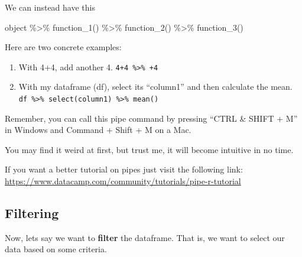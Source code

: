 \documentclass[
]{book}
\newenvironment{Shaded}{\begin{snugshade}}{\end{snugshade}}
\newcommand{\FunctionTok}[1]{\textcolor[rgb]{0.00,0.00,0.00}{#1}}
\newcommand{\NormalTok}[1]{#1}
\newcommand{\SpecialCharTok}[1]{\textcolor[rgb]{0.00,0.00,0.00}{#1}}
\begin{document}
We can instead have this

\begin{Shaded}
\begin{Highlighting}[]
\NormalTok{object }\SpecialCharTok{\%\textgreater{}\%} 
  \FunctionTok{function\_1}\NormalTok{() }\SpecialCharTok{\%\textgreater{}\%} 
  \FunctionTok{function\_2}\NormalTok{() }\SpecialCharTok{\%\textgreater{}\%} 
  \FunctionTok{function\_3}\NormalTok{()}
\end{Highlighting}
\end{Shaded}

Here are two concrete examples:

\begin{enumerate}
\def\labelenumi{\arabic{enumi}.}
\item
  With 4+4, add another 4.
  \texttt{4+4\ \%\textgreater{}\%\ +4}
\item
  With my dataframe (df), select its ``column1'' and then calculate the mean.
  \texttt{df\ \%\textgreater{}\%\ select(column1)\ \%\textgreater{}\%\ mean()}
\end{enumerate}

Remember, you can call this pipe command by pressing ``CTRL \& SHIFT + M'' in Windows and Command + Shift + M on a Mac.

You may find it weird at first, but trust me, it will become intuitive in no time.

If you want a better tutorial on pipes just visit the following link: \url{https://www.datacamp.com/community/tutorials/pipe-r-tutorial}

\hypertarget{filtering}{%
\subsection{Filtering}\label{filtering}}

Now, lets say we want to \textbf{filter} the dataframe.
That is, we want to select our data based on some criteria.
\end{document}
